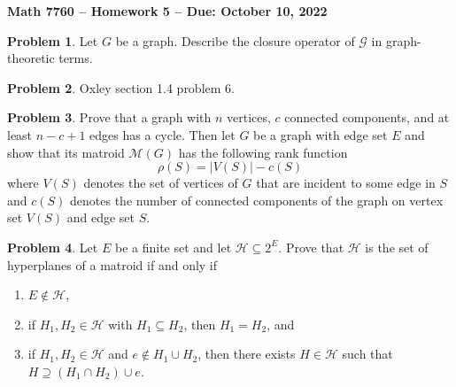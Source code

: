 \documentclass[letterpaper,11pt]{amsart}
\theoremstyle{plain}
\theoremstyle{definition}
\newtheorem{pr}{Problem}
\theoremstyle{remark}
\begin{document}
\Large

\begin{center}
{\bf Math 7760 -- Homework  5 --  Due:  October 10, 2022}
\end{center}

\normalsize


\bigskip


\bigskip

\begin{pr}
    Let $G$ be a graph. Describe the closure operator of $\mathcal{G}$ in graph-theoretic terms.
\end{pr}

\begin{pr}
    Oxley section 1.4 problem 6.
\end{pr}

\bigskip

\bigskip

\begin{pr}
    Prove that a graph with $n$ vertices, $c$ connected components, and at least $n - c + 1$ edges has a cycle.
    Then let $G$ be a graph with edge set $E$ and show that its matroid $\mathcal{M}(G)$
    has the following rank function
    \[
        \rho(S) = |V(S)| - c(S)
    \]
    where $V(S)$ denotes the set of vertices of $G$ that are incident to some edge in $S$ and $c(S)$ denotes the number of connected components of the graph on vertex set $V(S)$ and edge set $S$.
\end{pr}

\begin{pr}
    Let $E$ be a finite set and let $\mathcal{H} \subseteq 2^E$.
    Prove that $\mathcal{H}$ is the set of hyperplanes of a matroid if and only if
    \begin{enumerate}
        \item $E \notin \mathcal{H}$,
        \item if $H_1,H_2 \in \mathcal{H}$ with $H_1 \subseteq H_2$, then $H_1 = H_2$, and
        \item if $H_1,H_2 \in \mathcal{H}$ and $e \notin H_1 \cup H_2$, then there exists $H \in \mathcal{H}$
        such that $H \supseteq (H_1 \cap H_2) \cup e$.
    \end{enumerate}
\end{pr}
\end{document}

